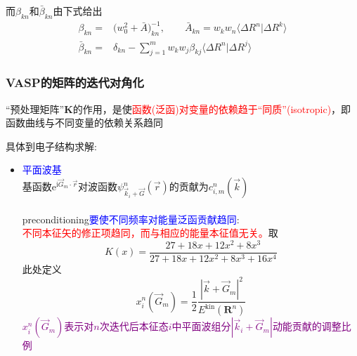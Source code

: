 {{\begin{itemize}
\begin{displaymath}
	\end{displaymath}
	而$\beta_{kn}$和$\bar\beta_{kn}$由下式给出
	\begin{displaymath}
		\begin{aligned}
			\beta_{kn}=&\big(w_0^2+\bar A\big)_{kn}^{-1},\qquad \bar A_{kn}=w_kw_n\langle\Delta R^n|\Delta R^k\rangle\\
			\bar\beta_{kn}=&\delta_{kn}-\sum_{j=1}^mw_kw_j\beta_{kj}\langle\Delta R^n|\Delta R^j\rangle
		\end{aligned}
	\end{displaymath}
		{\fontsize{7.2pt}{4.2pt}}
	\end{itemize}
}

\frame
{
	\frametitle{\textrm{VASP}的矩阵的迭代对角化}
	``预处理矩阵''$\mathbf{K}$的作用，是使\textcolor{red}{函数(泛函)对变量的依赖趋于“同质”(\textrm{isotropic})}，即函数曲线与不同变量的依赖关系趋同

	具体到电子结构求解:~
	\begin{itemize}
		\item \textcolor{blue}{平面波基}\\
			基函数$\mathrm{e}^{\mathrm{i}\vec G_m\cdot\vec r}$对波函数$\psi_{\vec k_i+\vec G}^n(\vec r)$的贡献为$c_{i,m}^n(\vec k)$\\
		{\fontsize{7.2pt}{4.2pt}\selectfont{
		在能量泛函表达式中，高频(大的$\vec G_m$)部分比低频(小的$\vec G_m$)贡献大得多}}\\
			\textrm{preconditioning}\textcolor{blue}{要使不同频率对能量泛函贡献趋同}:\\
			\textcolor{red}{不同本征矢的修正项趋同，而与相应的能量本征值无关。}取
	\begin{displaymath}
		K(x)=\dfrac{27+18x+12x^2+8x^3}{27+18x+12x^2+8x^3+16x^4}
	\end{displaymath}
	此处定义
	\begin{displaymath}
		x_i^n(\vec G_m)=\dfrac12\dfrac{|\vec k+\vec G_m|^2}{E^{\mathrm{kin}}(\mathbf{R}^n)}
	\end{displaymath}
	\textcolor{purple}{$x_i^n(\vec G_m)$表示对$n$次迭代后本征态$i$中平面波组分$|\vec k_i+\vec G_m|$动能贡献的调整比例}
	\end{itemize}
}

}
